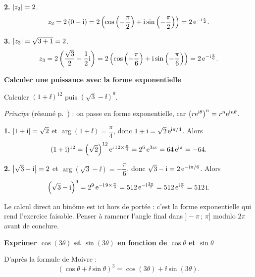 \textbf{2.} $\left|z_2\right| = 2$.
$$
z_2 = 2\left(0 - \mathrm{i}\right) = 2\left(\cos\left(-\frac{\pi}{2}\right)
+ \mathrm{i}\sin\left(-\frac{\pi}{2}\right)\right) = 2\,\mathrm{e}^{-\mathrm{i}\frac{\pi}{2}}.
$$

\textbf{3.} $\left|z_3\right| = \sqrt{3+1} = 2$.
$$
z_3 = 2\left(\frac{\sqrt{3}}{2} - \frac{1}{2}\mathrm{i}\right)
= 2\left(\cos\left(-\frac{\pi}{6}\right) + \mathrm{i}\sin\left(-\frac{\pi}{6}\right)\right)
= 2\,\mathrm{e}^{-\mathrm{i}\frac{\pi}{6}}.
$$



\exerciceresolu
\textbf{Calculer une puissance avec la forme exponentielle}

Calculer $(1 + \ii)^{12}$ puis $\left(\sqrt{3} - \ii\right)^{9}$.

\solution

\emph{Principe} (résumé p.~\pageref{res:cplx_expo}) : on passe en forme
exponentielle, car $\bigl(r\mathrm{e}^{\mathrm{i}\theta}\bigr)^{n} = r^{n}\mathrm{e}^{\mathrm{i} n\theta}$.

\textbf{1.} $\left|1+\mathrm{i}\right| = \sqrt{2}$ et $\arg(1+\ii) = \dfrac{\pi}{4}$, donc
$1 + \mathrm{i} = \sqrt{2}\,\mathrm{e}^{\mathrm{i}\pi/4}$. Alors
$$
(1+\mathrm{i})^{12} = \left(\sqrt{2}\right)^{12}\mathrm{e}^{\mathrm{i}\,12\times\frac{\pi}{4}}
= 2^{6}\,\mathrm{e}^{3\mathrm{i}\pi} = 64\,\mathrm{e}^{\mathrm{i}\pi} = -64.
$$

\textbf{2.} $\left|\sqrt3 - \mathrm{i}\right| = 2$ et $\arg(\sqrt3-\ii) = -\dfrac{\pi}{6}$,
donc $\sqrt3 - \mathrm{i} = 2\,\mathrm{e}^{-\mathrm{i}\pi/6}$. Alors
$$
\left(\sqrt3 - \mathrm{i}\right)^{9} = 2^{9}\,\mathrm{e}^{-\mathrm{i}\,9\times\frac{\pi}{6}}
= 512\,\mathrm{e}^{-\mathrm{i}\frac{3\pi}{2}} = 512\,\mathrm{e}^{\mathrm{i}\frac{\pi}{2}} = 512\,\mathrm{i}.
$$

\begin{attention}
	Le calcul direct au binôme est ici hors de portée : c'est la forme
	exponentielle qui rend l'exercice faisable. Penser à ramener l'angle
	final dans $]-\pi\,;\,\pi]$ modulo $2\pi$ avant de conclure.
\end{attention}



\exerciceresolu
\textbf{Exprimer $\cos(3\theta)$ et $\sin(3\theta)$ en fonction de $\cos\theta$ et $\sin\theta$}

\solution

D'après la formule de Moivre :
$$
(\cos\theta + \ii\sin\theta)^3 = \cos(3\theta) + \ii\sin(3\theta).
$$

